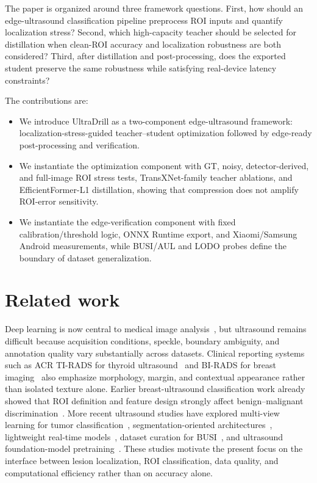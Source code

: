 \documentclass[preprint,12pt]{elsarticle}
\begin{document}
The paper is organized around three framework questions. First, how should an edge-ultrasound classification pipeline preprocess ROI inputs and quantify localization stress? Second, which high-capacity teacher should be selected for distillation when clean-ROI accuracy and localization robustness are both considered? Third, after distillation and post-processing, does the exported student preserve the same robustness while satisfying real-device latency constraints?

The contributions are:
\begin{itemize}[leftmargin=1.5em]
    \item We introduce UltraDrill as a two-component edge-ultrasound framework: localization-stress-guided teacher--student optimization followed by edge-ready post-processing and verification.
    \item We instantiate the optimization component with GT, noisy, detector-derived, and full-image ROI stress tests, TransXNet-family teacher ablations, and EfficientFormer-L1 distillation, showing that compression does not amplify ROI-error sensitivity.
    \item We instantiate the edge-verification component with fixed calibration/threshold logic, ONNX Runtime export, and Xiaomi/Samsung Android measurements, while BUSI/AUL and LODO probes define the boundary of dataset generalization.
\end{itemize}
\FloatBarrier

\section{Related work}
\label{sec:related_work}

Deep learning is now central to medical image analysis~\cite{litjens2017survey}, but ultrasound remains difficult because acquisition conditions, speckle, boundary ambiguity, and annotation quality vary substantially across datasets. Clinical reporting systems such as ACR TI-RADS for thyroid ultrasound~\cite{tessler2017tirads} and BI-RADS for breast imaging~\cite{acr_birads} also emphasize morphology, margin, and contextual appearance rather than isolated texture alone. Earlier breast-ultrasound classification work already showed that ROI definition and feature design strongly affect benign--malignant discrimination~\cite{G_mez_Flores_2015}. More recent ultrasound studies have explored multi-view learning for tumor classification~\cite{Luo_2023}, segmentation-oriented architectures~\cite{Chen_2023}, lightweight real-time models~\cite{Wang_2024,Ren_2025}, dataset curation for BUSI~\cite{aumente2025curatedbusi}, and ultrasound foundation-model pretraining~\cite{meyer2024ultrasam}. These studies motivate the present focus on the interface between lesion localization, ROI classification, data quality, and computational efficiency rather than on accuracy alone.
\end{document}
